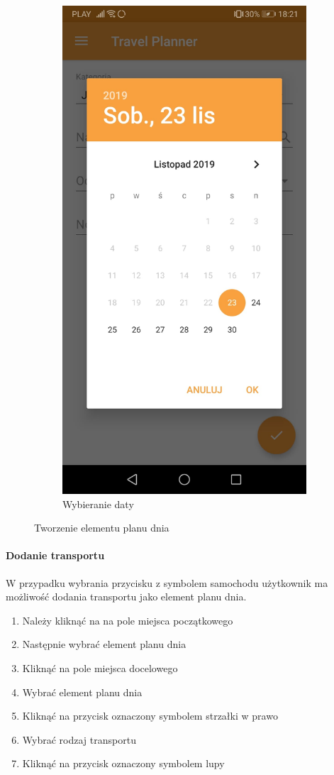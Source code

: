 \documentclass[10pt,twoside,a4paper]{report}
\begin{document}
\begin{figure}[h]
\begin{subfigure}{0.5\textwidth}
\includegraphics[width=0.9\linewidth, width=5cm]{calendar}
\caption{Wybieranie daty}
\label{fig:calendar}
\end{subfigure}
\caption{Tworzenie elementu planu dnia}
\label{fig:podrecznik7}
\end{figure}
\FloatBarrier
\paragraph{Dodanie transportu}
W przypadku wybrania przycisku z symbolem samochodu użytkownik ma możliwość dodania transportu jako element planu dnia.
\begin{enumerate}
\item Należy kliknąć na na pole miejsca początkowego
\item Następnie wybrać element planu dnia
\item Kliknąć na pole miejsca docelowego
\item Wybrać element planu dnia
\item Kliknąć na przycisk oznaczony symbolem strzałki w prawo
\item Wybrać rodzaj transportu
\item Kliknąć na przycisk oznaczony symbolem lupy
\end{enumerate}
\end{document}
